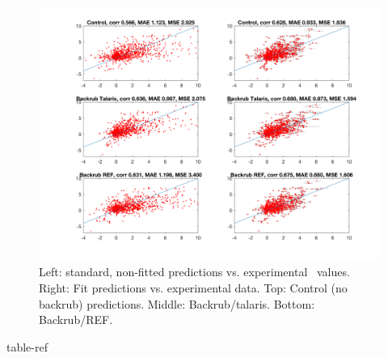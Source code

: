 \begin{figure}
  \includegraphics[width=\textwidth,keepaspectratio]{figures/zemu-sigmoid2-corrs.png}
  \caption{
    Left: standard, non-fitted predictions vs. experimental \ddg\ values. Right: Fit predictions vs. experimental data. Top: Control (no backrub) predictions. Middle: Backrub/talaris. Bottom: Backrub/REF.
  } \label{fig:t14-fit-scatter}
\end{figure}

{table-ref}